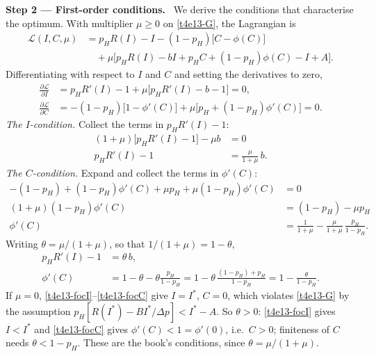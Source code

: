 \documentclass[11pt,a4paper]{article}
\newcommand{\step}[2]{\par\medskip\noindent\textbf{Step #1 --- #2.}~}
\begin{document}
\step{2}{First-order conditions} We derive the conditions that characterise the optimum. With
multiplier $\mu\ge0$ on \eqref{t4e13-G}, the Lagrangian is
\begin{align}
  \mathcal L(I,C,\mu) &= p_HR(I)-I-(1-p_H)\big[C-\phi(C)\big] \nonumber\\
     &\quad+\mu\big[p_HR(I)-bI+p_HC+(1-p_H)\phi(C)-I+A\big]. \nonumber
\end{align}
Differentiating with respect to $I$ and $C$ and setting the derivatives to zero,
\begin{align}
  \frac{\partial\mathcal L}{\partial I}&=p_HR'(I)-1+\mu\big[p_HR'(I)-b-1\big]=0, \nonumber\\
  \frac{\partial\mathcal L}{\partial C}&=-(1-p_H)\big[1-\phi'(C)\big]+\mu\big[p_H+(1-p_H)\phi'(C)\big]=0. \nonumber
\end{align}
\emph{The $I$-condition.} Collect the terms in $p_HR'(I)-1$:
\begin{align}
  (1+\mu)\big[p_HR'(I)-1\big]-\mu b &= 0 \nonumber\\
  p_HR'(I)-1 &= \frac{\mu}{1+\mu}\,b. \nonumber
\end{align}
\emph{The $C$-condition.} Expand and collect the terms in $\phi'(C)$:
\begin{align}
  -(1-p_H)+(1-p_H)\phi'(C)+\mu p_H+\mu(1-p_H)\phi'(C) &= 0 \nonumber\\
  (1+\mu)(1-p_H)\phi'(C) &= (1-p_H)-\mu p_H \nonumber\\
  \phi'(C) &= \frac{1}{1+\mu}-\frac{\mu}{1+\mu}\,\frac{p_H}{1-p_H}. \nonumber
\end{align}
Writing $\theta=\mu/(1+\mu)$, so that $1/(1+\mu)=1-\theta$,
\begin{align}
  p_HR'(I)-1 &= \theta\,b, \label{t4e13-focI}\\
  \phi'(C) &= 1-\theta-\theta\frac{p_H}{1-p_H}=1-\theta\,\frac{(1-p_H)+p_H}{1-p_H}=1-\frac{\theta}{1-p_H}. \label{t4e13-focC}
\end{align}
If $\mu=0$, \eqref{t4e13-focI}--\eqref{t4e13-focC} give $I=I^*$, $C=0$, which violates \eqref{t4e13-G}
by the assumption $p_H[R(I^*)-BI^*/\Delta p]<I^*-A$. So $\theta>0$: \eqref{t4e13-focI} gives $I<I^*$ and
\eqref{t4e13-focC} gives $\phi'(C)<1=\phi'(0)$, i.e.\ $C>0$; finiteness of $C$ needs
$\theta<1-p_H$. These are the book's conditions, since $\theta=\mu/(1+\mu)$.
\end{document}
